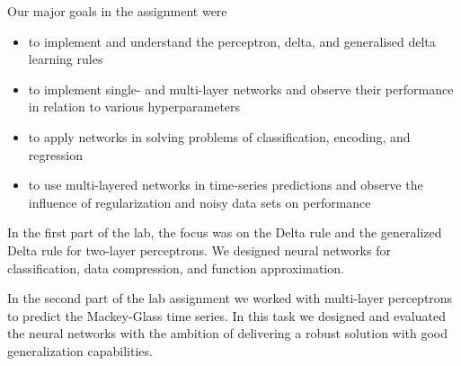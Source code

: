 \documentclass[a4paper]{article}
\begin{document}
Our major goals in the assignment were  
\begin{itemize}
    \item to implement and understand the perceptron, delta, and generalised delta learning rules
    \item to implement single- and multi-layer networks and observe their performance in relation to various hyperparameters
    \item to apply networks in solving problems of classification, encoding, and regression
    \item to use multi-layered networks in time-series predictions and observe the influence of regularization and noisy data sets on performance
\end{itemize}


In the first part of the lab, the focus was on the Delta rule and the generalized Delta rule for two-layer perceptrons.
We designed neural networks for classification, data compression, and function approximation.

In the second part of the lab assignment we worked with multi-layer perceptrons to predict the Mackey-Glass time series. In this task we designed and evaluated the neural
networks with the ambition of delivering a robust solution with good generalization capabilities. %
\end{document}
